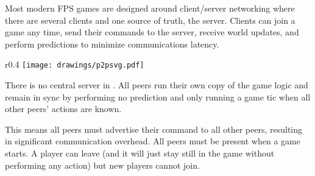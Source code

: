 Most modern FPS games are designed around client/server networking where there are several clients and one source of truth, the server. Clients can join a game any time, send their commands to the server, receive world updates, and perform predictions to minimize communications latency.\\
\par
\begin{wrapfigure}[12]{r}{0.4\textwidth}
\centering
\texttt{[image: drawings/p2psvg.pdf]}
\end{wrapfigure}
There is no central server in \doom. All peers run their own copy of the game logic and remain in sync by performing no prediction and only running a game tic when all other peers' actions are known.\\
\par
 This means all peers must advertise their command to all other peers, resulting in significant communication overhead. 
All peers must be present when a game starts. A player can leave (and it will just stay still in the game without performing any action) but new players cannot join.
\pagebreak





